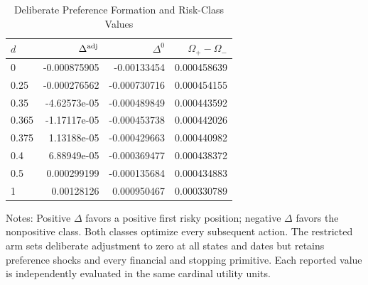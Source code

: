 \begin{table}[!htbp]
\centering\small
\caption{Deliberate Preference Formation and Risk-Class Values}
\label{tab:r6_option}
\begin{tabular}{lrrr}
\toprule
$d$ & $\Delta^{\rm adj}$ & $\Delta^0$ & $\Omega_+-\Omega_-$ \\
\midrule
0 & -0.000875905 & -0.00133454 & 0.000458639 \\
0.25 & -0.000276562 & -0.000730716 & 0.000454155 \\
0.35 & -4.62573e-05 & -0.000489849 & 0.000443592 \\
0.365 & -1.17117e-05 & -0.000453738 & 0.000442026 \\
0.375 & 1.13188e-05 & -0.000429663 & 0.000440982 \\
0.4 & 6.88949e-05 & -0.000369477 & 0.000438372 \\
0.5 & 0.000299199 & -0.000135684 & 0.000434883 \\
1 & 0.00128126 & 0.000950467 & 0.000330789 \\
\bottomrule
\end{tabular}
\par\smallskip
\begin{minipage}{0.98\linewidth}\footnotesize
Notes: Positive $\Delta$ favors a positive first risky position; negative $\Delta$ favors the nonpositive class. Both classes optimize every subsequent action. The restricted arm sets deliberate adjustment to zero at all states and dates but retains preference shocks and every financial and stopping primitive. Each reported value is independently evaluated in the same cardinal utility units.
\end{minipage}
\end{table}
